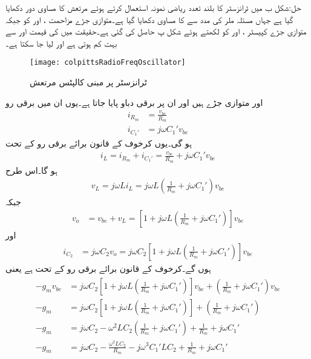 حل:شکل  ب میں ٹرانزسٹر کا بلند تعدد ریاضی نمونہ استعمال کرتے ہوئے مرتعش کا مساوی دور دکھایا گیا ہے جہاں مسئلہ ملر کی مدد سے  کا مساوی  دکھایا گیا ہے۔متوازی جڑے مزاحمت ،  اور  کو  جبکہ متوازی جڑے کپیسٹر ،  اور  کو  لکھتے ہوئے شکل  پ حاصل کی گئی ہے۔حقیقت میں  کی قیمت اور  سے بہت کم ہوتی ہے اور  لیا جا سکتا ہے۔  
\begin{figure}
\centering
\texttt{[image: colpittsRadioFreqOscillator]}
\caption{ٹرانزسٹر پر مبنی کالپٹس مرتعش}
\label{شکل_مرتعش_کالپٹس}
\end{figure}
 اور  متوازی جڑے ہیں اور ان پر برقی دباو  پایا جاتا ہے۔یوں ان میں برقی رو
\begin{align*}
i_{R_m}&=\frac{v_{be}}{R_m}\\
i_{C_1'}&=j \omega C_1' v_{be}
\end{align*}
ہو گی۔یوں کرخوف کے قانون برائے برقی رو کے تحت
\begin{align*}
i_L=i_{R_m}+i_{C_1'}=\frac{v_{be}}{R_m}+j \omega C_1' v_{be}
\end{align*}
ہو گا۔اس طرح
\begin{align*}
v_L=j \omega L i_L=j \omega L \left(\frac{1}{R_m}+j \omega C_1' \right) v_{be}
\end{align*}
جبکہ
\begin{align*}
v_o&=v_{be}+v_L=\left[1+ j \omega L \left(\frac{1}{R_m}+j \omega C_1' \right) \right] v_{be}
\end{align*}
اور
\begin{align*}
i_{C_2}&=j \omega C_2 v_o=j \omega C_2 \left[1+ j \omega L \left(\frac{1}{R_m}+j \omega C_1' \right) \right] v_{be}
\end{align*}
ہوں گے۔کرخوف کے قانون برائے برقی رو کے تحت  ہے یعنی
\begin{gather}
\begin{aligned} \label{مساوات_مرتعش_ٹرانزسٹر_کالپٹس_مثال_الف}
-g_m v_{be}&=j \omega C_2 \left[1+ j \omega L \left(\frac{1}{R_m}+j \omega C_1' \right) \right] v_{be}+\left(\frac{1}{R_m}+j \omega C_1'\right) v_{be}\\
-g_m&=j \omega C_2 \left[1+ j \omega L \left(\frac{1}{R_m}+j \omega C_1' \right) \right] +\left(\frac{1}{R_m}+j \omega C_1'\right)\\
-g_m&=j \omega C_2 - \omega^2 L C_2 \left(\frac{1}{R_m}+j \omega C_1' \right)  +\frac{1}{R_m}+j \omega C_1'\\
-g_m&=j \omega C_2 -\frac{ \omega^2 L C_2 }{R_m}-j \omega^3 C_1' L C_2  +\frac{1}{R_m}+j \omega C_1'
\end{aligned}
\end{gather}
